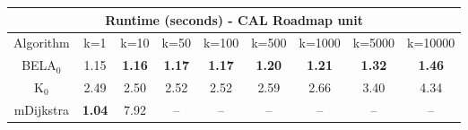 \begin{tabular}{c|cccccccc}\toprule
\multicolumn{9}{c}{Runtime (seconds) - CAL Roadmap unit}\\ \midrule
Algorithm & k=1 & k=10 & k=50 & k=100 & k=500 & k=1000 & k=5000 & k=10000 \\ \midrule
BELA$_0$ & 1.15 & \textbf{1.16} & \textbf{1.17} & \textbf{1.17} & \textbf{1.20} & \textbf{1.21} & \textbf{1.32} & \textbf{1.46} \\
K$_0$ & 2.49 & 2.50 & 2.52 & 2.52 & 2.59 & 2.66 & 3.40 & 4.34 \\
mDijkstra & \textbf{1.04} & 7.92 & -- & -- & -- & -- & -- & -- \\ \bottomrule 
\end{tabular}

